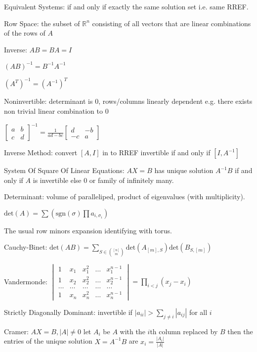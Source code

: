 Equivalent Systems: if and only if exactly the same solution set i.e. same RREF.

Row Space: the subset of $\mathbb{R}^n$ consisting of all vectors that are linear combinations of the rows of $A$

Inverse: $AB=BA=I$

$(AB)^{-1}=B^{-1}A^{-1}$

$(A^T)^{-1}=(A^{-1})^T$

Noninvertible: determinant is $0$, rows/columns linearly dependent e.g. there exists non trivial linear combination to $0$

$\begin{bmatrix} a & b \\ c & d \end{bmatrix}^{-1} = \frac{1}{ad-bc} \begin{bmatrix} d & -b \\ -c & a \end{bmatrix}$

Inverse Method: convert $[A,I]$ in to RREF invertible if and only if $[I,A^{-1}]$

System Of Square Of Linear Equations: $AX=B$ has unique solution $A^{-1}B$ if and only if $A$ is invertible else $0$ or family of infinitely many.

Determinant: volume of paralleliped, product of eigenvalues (with multiplicity).

$\text{det} (A)=\sum \left( \text{sgn} (\sigma) \prod a_{i,\sigma_i} \right)$

The usual row minors expansion identifying with torus.

Cauchy-Binet: $\text{det}(AB)=\sum_{S \in \binom{[n]}{m}}\text{det}(A_{[m],S})\text{det}(B_{S,[m]})$

Vandermonde: $\begin{vmatrix} 1 & x_1 & x_1^2 & \dots & x_1^{n-1} \\ 1 & x_2 & x_2^2 & \dots & x_2^{n-1} \\ \dots & \dots & \dots & \dots & \dots \\ 1 & x_n & x_n^2 & \dots & x_n^{n-1} \end{vmatrix} = \prod_{i<j} (x_j-x_i)$

Strictly Diagonally Dominant: invertible if $|a_{ii}| > \sum_{j \neq i} |a_{ij}|$ for all $i$

Cramer: $AX=B, |A|\neq 0$ let $A_i$ be $A$ with the $i$th column replaced by $B$ then the entries of the unique solution $X=A^{-1}B$ are $x_i=\frac{|A_i|}{|A|}$

